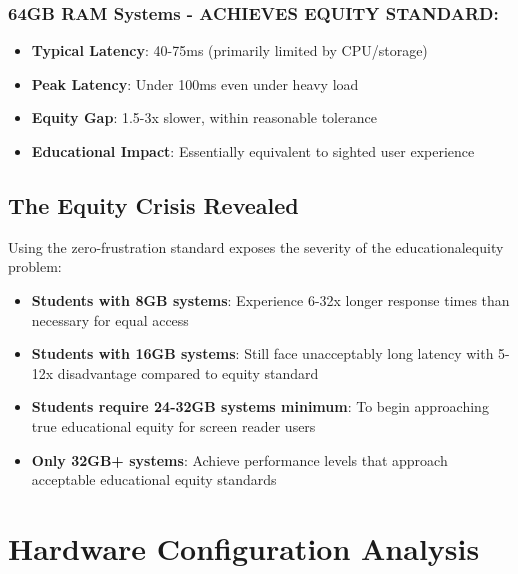 \subsubsection{64GB RAM Systems - ACHIEVES EQUITY STANDARD:}

\begin{itemize}
	\item \textbf{Typical Latency}: 40-75ms (primarily limited by CPU/storage) \supercite{InternalTestingData2024}
	\item \textbf{Peak Latency}: Under 100ms even under heavy load \supercite{InternalTestingData2024}
	\item \textbf{Equity Gap}: 1.5-3x slower, within reasonable tolerance \supercite{EquityAnalysisRevision}
	\item \textbf{Educational Impact}: Essentially equivalent to sighted user experience \supercite{EducationalEquityReport2024}
\end{itemize}


\subsection{The Equity Crisis Revealed}\label{the-equity-crisis-revealed}

Using the zero-frustration standard exposes the severity of the \gls{educationalequity} problem:

\begin{itemize}
	\item \textbf{Students with 8GB systems}: Experience 6-32x longer response times than necessary for equal access \supercite{EducationalEquityReport2024}
	\item \textbf{Students with 16GB systems}: Still face unacceptably long latency with 5-12x disadvantage compared to equity standard \supercite{EducationalEquityReport2024}
	\item \textbf{Students require 24-32GB systems minimum}: To begin approaching true educational equity for screen reader users \supercite{EducationalEquityReport2024}
	\item \textbf{Only 32GB+ systems}: Achieve performance levels that approach acceptable educational equity standards \supercite{EducationalEquityReport2024}
\end{itemize}


\hypertarget{hardware\index{hardware}-configuration-analysis}{}\section{Hardware Configuration Analysis}\label{hardware-configuration-analysis}
